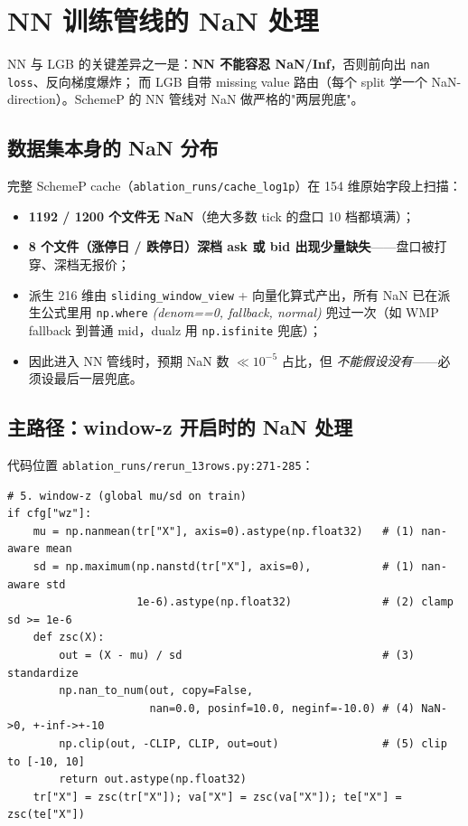\documentclass[10.5pt,a4paper]{article}
\begin{document}
\section{NN 训练管线的 NaN 处理}
\label{sec:nn-nan}

NN 与 LGB 的关键差异之一是：\textbf{NN 不能容忍 NaN/Inf}，否则前向出 \texttt{nan loss}、反向梯度爆炸；
而 LGB 自带 missing value 路由（每个 split 学一个 NaN-direction）。SchemeP 的 NN 管线对 NaN 做严格的"两层兜底"。

\subsection{数据集本身的 NaN 分布}

完整 SchemeP cache（\texttt{ablation\_runs/cache\_log1p}）在 154 维原始字段上扫描：
\begin{itemize}[leftmargin=2em,itemsep=1pt,topsep=2pt]
  \item \textbf{1192 / 1200 个文件无 NaN}（绝大多数 tick 的盘口 10 档都填满）；
  \item \textbf{8 个文件（涨停日 / 跌停日）深档 ask 或 bid 出现少量缺失}——盘口被打穿、深档无报价；
  \item 派生 216 维由 \texttt{sliding\_window\_view} + 向量化算式产出，所有 NaN 已在派生公式里用 \texttt{np.where} \emph{(denom==0, fallback, normal)} 兜过一次（如 WMP fallback 到普通 mid，dualz 用 \texttt{np.isfinite} 兜底）；
  \item 因此进入 NN 管线时，预期 NaN 数 $\ll 10^{-5}$ 占比，但 \emph{不能假设没有}——必须设最后一层兜底。
\end{itemize}

\subsection{主路径：window-z 开启时的 NaN 处理}

代码位置 \texttt{ablation\_runs/rerun\_13rows.py:271-285}：

\begin{lstlisting}
# 5. window-z (global mu/sd on train)
if cfg["wz"]:
    mu = np.nanmean(tr["X"], axis=0).astype(np.float32)   # (1) nan-aware mean
    sd = np.maximum(np.nanstd(tr["X"], axis=0),           # (1) nan-aware std
                    1e-6).astype(np.float32)              # (2) clamp sd >= 1e-6
    def zsc(X):
        out = (X - mu) / sd                               # (3) standardize
        np.nan_to_num(out, copy=False,
                      nan=0.0, posinf=10.0, neginf=-10.0) # (4) NaN->0, +-inf->+-10
        np.clip(out, -CLIP, CLIP, out=out)                # (5) clip to [-10, 10]
        return out.astype(np.float32)
    tr["X"] = zsc(tr["X"]); va["X"] = zsc(va["X"]); te["X"] = zsc(te["X"])
\end{lstlisting}
\end{document}
